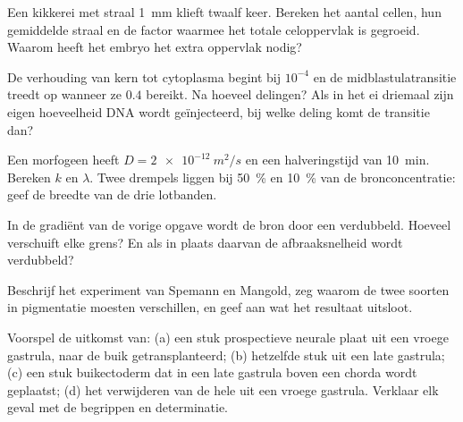 \begin{exercise}[$\star\star$]\label{exo:b2:vertebrate-development:5}
Een kikkerei met straal \qty{1}{mm} klieft twaalf keer. Bereken het aantal
cellen, hun gemiddelde straal en de factor waarmee het totale
celoppervlak is gegroeid. Waarom heeft het embryo het extra oppervlak
nodig?
\end{exercise}

\begin{exercise}[$\star\star$]\label{exo:b2:vertebrate-development:6}
De verhouding van kern tot cytoplasma begint bij $10^{-4}$ en de
midblastulatransitie treedt op wanneer ze $0.4$ bereikt. Na hoeveel
delingen? Als in het ei driemaal zijn eigen hoeveelheid DNA wordt
geïnjecteerd, bij welke deling komt de transitie dan?
\end{exercise}

\begin{exercise}[$\star\star$]\label{exo:b2:vertebrate-development:7}
Een morfogeen heeft $D = \qty{2e-12}{m^2/s}$ en een halveringstijd van
\qty{10}{min}. Bereken $k$ en $\lambda$. Twee drempels liggen bij
\qty{50}{\%} en \qty{10}{\%} van de bronconcentratie: geef de breedte van
de drie lotbanden.
\end{exercise}

\begin{exercise}[$\star\star$]\label{exo:b2:vertebrate-development:8}
In de gradiënt van de vorige opgave wordt de bron door een 
verdubbeld. Hoeveel verschuift elke grens? En als in plaats daarvan de
afbraaksnelheid wordt verdubbeld?
\end{exercise}

\begin{exercise}[$\star\star$]\label{exo:b2:vertebrate-development:9}
Beschrijf het experiment van Spemann en Mangold, zeg waarom de twee soorten
in pigmentatie moesten verschillen, en geef aan wat het resultaat uitsloot.
\end{exercise}

\begin{exercise}[$\star\star\star$]\label{exo:b2:vertebrate-development:10}
Voorspel de uitkomst van: (a) een stuk prospectieve neurale plaat uit een
vroege gastrula, naar de buik getransplanteerd; (b) hetzelfde stuk uit een
late gastrula; (c) een stuk buikectoderm dat in een late gastrula boven een
chorda wordt geplaatst; (d) het verwijderen van de hele  uit een
vroege gastrula. Verklaar elk geval met de begrippen  en
determinatie.
\end{exercise}

